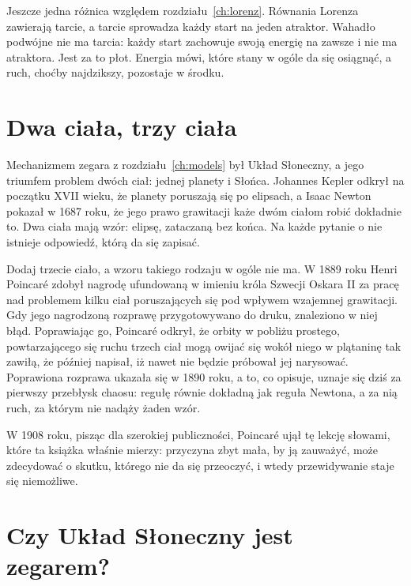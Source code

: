 \noindent
Jeszcze jedna różnica względem rozdziału~\ref{ch:lorenz}. Równania Lorenza
zawierają tarcie, a tarcie sprowadza każdy start na jeden atraktor. Wahadło
podwójne nie ma tarcia: każdy start zachowuje swoją energię na zawsze i nie
ma atraktora. Jest za to płot. Energia mówi, które stany w ogóle da się
osiągnąć, a ruch, choćby najdzikszy, pozostaje w środku.

\section{Dwa ciała, trzy ciała}
\label{sec:ch13-three}

\noindent
Mechanizmem zegara z rozdziału~\ref{ch:models} był Układ Słoneczny, a jego
triumfem problem dwóch ciał: jednej planety i Słońca. Johannes Kepler odkrył
na początku XVII wieku, że planety poruszają się po elipsach, a Isaac Newton
pokazał w 1687 roku, że jego prawo grawitacji każe dwóm ciałom robić dokładnie
to. Dwa ciała mają wzór: elipsę, zataczaną bez końca. Na każde pytanie o nie
istnieje odpowiedź, którą da się zapisać.

Dodaj trzecie ciało, a wzoru takiego rodzaju w ogóle nie ma. W 1889 roku
Henri Poincaré zdobył nagrodę ufundowaną w imieniu króla Szwecji Oskara II za
pracę nad problemem kilku ciał poruszających się pod wpływem wzajemnej
grawitacji. Gdy jego nagrodzoną rozprawę przygotowywano do druku, znaleziono
w niej błąd. Poprawiając go, Poincaré odkrył, że orbity w pobliżu prostego,
powtarzającego się ruchu trzech ciał mogą owijać się wokół niego w plątaninę
tak zawiłą, że później napisał, iż nawet nie będzie próbował jej narysować.
Poprawiona rozprawa ukazała się w 1890 roku, a to, co opisuje, uznaje się
dziś za pierwszy przebłysk chaosu: regułę równie dokładną jak reguła
Newtona, a za nią ruch, za którym nie nadąży żaden wzór.

W 1908 roku, pisząc dla szerokiej publiczności, Poincaré ujął tę lekcję
słowami, które ta książka właśnie mierzy: przyczyna zbyt mała, by ją
zauważyć, może zdecydować o skutku, którego nie da się przeoczyć, i wtedy
przewidywanie staje się niemożliwe.


\section{Czy Układ Słoneczny jest zegarem?}
\label{sec:ch13-solar}

